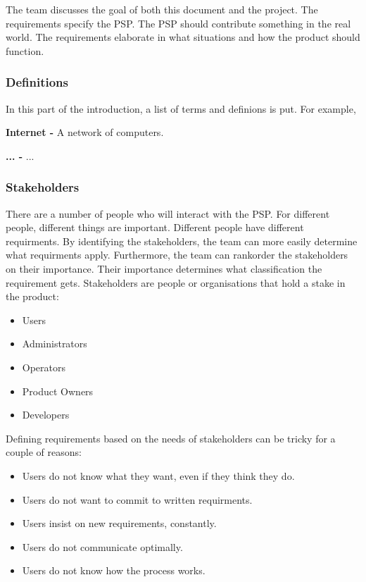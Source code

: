 \documentclass[10pt]{report}
\begin{document}
The team discusses the goal of both this document and the project. The requirements specify the PSP. The PSP should contribute something in the real world. The requirements elaborate in what situations and how the product should function.

\subsubsection{Definitions}

In this part of the introduction, a list of terms and definions is put. For example,

\textbf{Internet - } A network of computers.

\textbf{... - } ...

\subsubsection{Stakeholders}

There are a number of people who will interact with the PSP. For different people, different things are important. Different people have different requirments. By identifying the stakeholders, the team can more easily determine what requirments apply. Furthermore, the team can rankorder the stakeholders on their importance. Their importance determines what classification the requirement gets. Stakeholders are people or organisations that hold a stake in the product:

\begin{itemize}
	\item Users
	\item Administrators
	\item Operators
	\item Product Owners
	\item Developers
\end{itemize}

\noindent Defining requirements based on the needs of stakeholders can be tricky for a couple of reasons:

\begin{itemize}
	\item Users do not know what they want, even if they think they do.
	\item Users do not want to commit to written requirments.
	\item Users insist on new requirements, constantly.
	\item Users do not communicate optimally.
	\item Users do not know how the process works.
\end{itemize}
\end{document}

